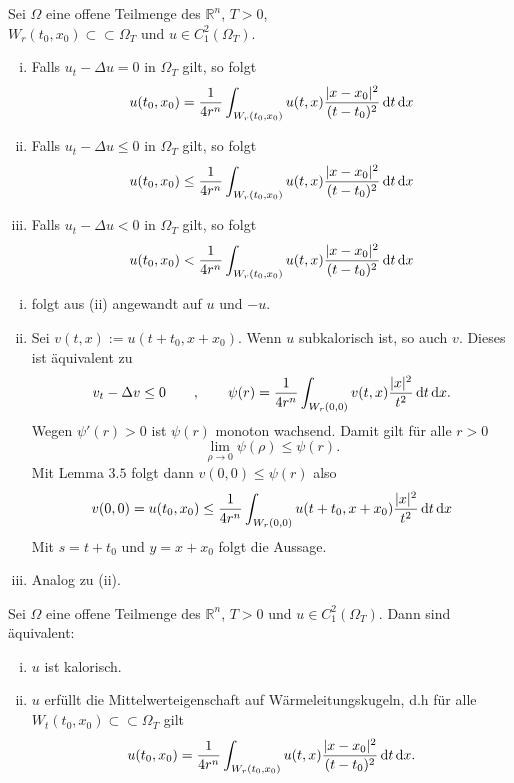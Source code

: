 
\begin{satz}[Mittelwerteigenschaft]
	Sei $\Omega$ eine offene Teilmenge des $\mathbb{R}^n$, $T >0$, \\ $W_r(t_0,x_0) \subset \subset \Omega_T$ und $u \in C^2_1(\Omega_T)$.
	\begin{enumerate}[(i)]
		\item Falls $u_t - \Delta u = 0$ in $\Omega_T$ gilt, so folgt 
		\[
			u(t_0,x_0) = \frac{1}{4r^n} \int_{W_r(t_0,x_0)}^{} u(t,x) \frac{\lvert x-x_0\rvert^2}{(t-t_0)^2} \,\mathrm{d}t \,\mathrm{d}x
		\]
		\item Falls $u_t - \Delta u \leq 0$ in $\Omega_T$ gilt, so folgt \[
			u(t_0,x_0) \leq \frac{1}{4r^n} \int_{W_r(t_0,x_0)}^{} u(t,x) \frac{\lvert x-x_0\rvert^2}{(t-t_0)^2} \,\mathrm{d}t \,\mathrm{d}x
		\] 
		\item Falls $u_t - \Delta u < 0$ in $\Omega_T$ gilt, so folgt 
		\[
			u(t_0,x_0) < \frac{1}{4r^n} \int_{W_r(t_0,x_0)}^{} u(t,x) \frac{\lvert x-x_0\rvert^2}{(t-t_0)^2} \,\mathrm{d}t \,\mathrm{d}x
		\]
	\end{enumerate}
\end{satz}
\begin{beweis}
	\begin{enumerate}[(i)]
		\item folgt aus (ii) angewandt auf $u$ und $-u$.
		\item Sei $v(t,x) := u(t+ t_0 , x +x_0)$. Wenn $u$ subkalorisch ist, so auch $v$. Dieses ist äquivalent zu 
		\[
			v_t - \Delta v \leq 0 \qquad , \qquad \psi(r) = \frac{1}{4r^n} \int_{W_r(0,0)}^{} v(t,x) \frac{\lvert x\rvert^2}{t^2} \,\mathrm{d}t \,\mathrm{d}x. 
		\]
		Wegen $\psi'(r)>0$ ist $\psi(r)$ monoton wachsend. Damit gilt für alle $r >0$
		\[
			\lim_{\rho \to 0} \psi(\rho) \leq \psi(r).
		\]
		Mit Lemma $3.5$ folgt dann $v(0,0) \leq \psi(r)$ also
		\[
			v(0,0) = u(t_0,x_0) \leq \frac{1}{4r^n} \int_{W_r(0,0)}^{} u(t+t_0,x+ x_0) \frac{\lvert x\rvert^2}{t^2} \,\mathrm{d}t \,\mathrm{d}x
		\]
		Mit $s = t+t_0$ und $y = x + x_0$ folgt die Aussage.
		\item Analog zu (ii).
	\end{enumerate}
\end{beweis}

\begin{korollar}
	Sei $\Omega$ eine offene Teilmenge des $\mathbb{R}^n$, $T>0$ und $u \in C^2_1(\Omega_T)$. Dann sind äquivalent:
	\begin{enumerate}[(i)]
		\item $u$ ist kalorisch.
		\item $u$ erfüllt die Mittelwerteigenschaft auf Wärmeleitungskugeln, d.h für alle \\ $W_t(t_0,x_0) \subset \subset \Omega_T$ gilt
		\[
			u(t_0,x_0) = \frac{1}{4r^n} \int_{W_r(t_0,x_0)}^{} u(t,x) \frac{\lvert x-x_0\rvert^2}{(t-t_0)^2} \,\mathrm{d}t \,\mathrm{d}x.
		\]
	\end{enumerate}
\end{korollar}

